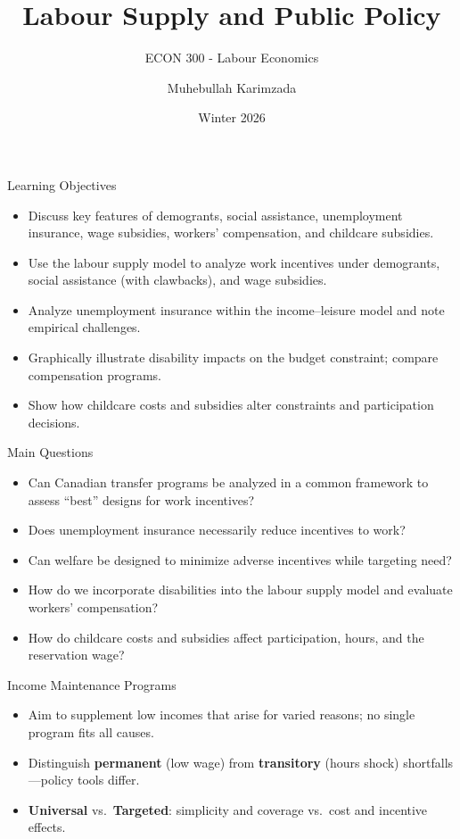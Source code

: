 \documentclass[aspectratio=169]{beamer}
\title{\textbf{Labour Supply and Public Policy
 \vspace{.5cm}\\  }}
\subtitle{ {\large ECON 300 - Labour Economics}}
\author{Muhebullah Karimzada}
\date{Winter 2026}
\begin{document}
\begin{frame}[plain]
  \titlepage
\end{frame}


\begin{frame}{Learning Objectives}
\transfade
\begin{itemize}
  \item Discuss key features of demogrants, social assistance, unemployment insurance, wage subsidies, workers’ compensation, and childcare subsidies.
  \item Use the labour supply model to analyze work incentives under demogrants, social assistance (with clawbacks), and wage subsidies.
  \item Analyze unemployment insurance within the income–leisure model and note empirical challenges.
  \item Graphically illustrate disability impacts on the budget constraint; compare compensation programs.
  \item Show how childcare costs and subsidies alter constraints and participation decisions.
\end{itemize}
\end{frame}

\begin{frame}{Main Questions}
\transfade
\begin{itemize}
  \item Can Canadian transfer programs be analyzed in a common framework to assess “best” designs for work incentives?
  \item Does unemployment insurance necessarily reduce incentives to work?
  \item Can welfare be designed to minimize adverse incentives while targeting need?
  \item How do we incorporate disabilities into the labour supply model and evaluate workers’ compensation?
  \item How do childcare costs and subsidies affect participation, hours, and the reservation wage?
\end{itemize}
\end{frame}


\begin{frame}{Income Maintenance Programs}
\transfade
\begin{itemize}
  \item Aim to supplement low incomes that arise for varied reasons; no single program fits all causes.
  \item Distinguish \textbf{permanent} (low wage) from \textbf{transitory} (hours shock) shortfalls—policy tools differ.
  \item \textbf{Universal} vs.\ \textbf{Targeted}: simplicity and coverage vs.\ cost and incentive effects.
\end{itemize}
\end{frame}
\end{document}
